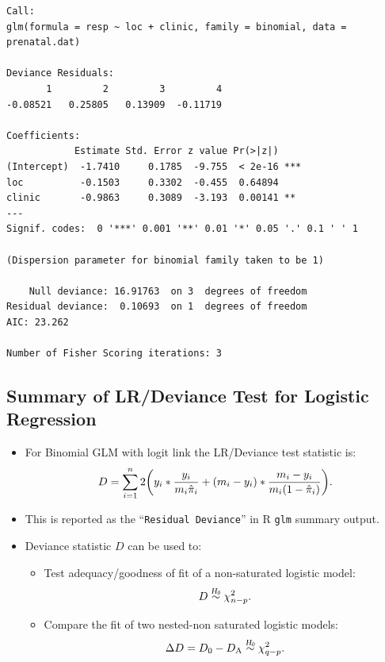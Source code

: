 \documentclass{article}\usepackage[]{graphicx}\usepackage[svgnames]{xcolor}
\makeatletter
\newenvironment{kframe}{%
 \def\at@end@of@kframe{}%
 \ifinner\ifhmode%
  \def\at@end@of@kframe{\end{minipage}}%
  \begin{minipage}{\columnwidth}%
 \fi\fi%
 \def\FrameCommand##1{\hskip\@totalleftmargin \hskip-\fboxsep
 \colorbox{shadecolor}{##1}\hskip-\fboxsep
     \hskip-\linewidth \hskip-\@totalleftmargin \hskip\columnwidth}%
 \MakeFramed {\advance\hsize-\width
   \@totalleftmargin\z@ \linewidth\hsize
   \@setminipage}}%
 {\par\unskip\endMakeFramed%
 \at@end@of@kframe}
\newenvironment{knitrout}{}{} %
\let\log\relax%
\newcommand{\HN}{\textsl{H}_{\textsl{0}}}%
\makeatother
\begin{document}
\begin{itemize}
\begin{knitrout}
\begin{kframe}
\begin{verbatim}
Call:
glm(formula = resp ~ loc + clinic, family = binomial, data = prenatal.dat)

Deviance Residuals: 
       1         2         3         4  
-0.08521   0.25805   0.13909  -0.11719  

Coefficients:
            Estimate Std. Error z value Pr(>|z|)    
(Intercept)  -1.7410     0.1785  -9.755  < 2e-16 ***
loc          -0.1503     0.3302  -0.455  0.64894    
clinic       -0.9863     0.3089  -3.193  0.00141 ** 
---
Signif. codes:  0 '***' 0.001 '**' 0.01 '*' 0.05 '.' 0.1 ' ' 1

(Dispersion parameter for binomial family taken to be 1)

    Null deviance: 16.91763  on 3  degrees of freedom
Residual deviance:  0.10693  on 1  degrees of freedom
AIC: 23.262

Number of Fisher Scoring iterations: 3
\end{verbatim}
\end{kframe}
\end{knitrout}
\end{itemize}
\subsection*{Summary of LR/Deviance Test for Logistic Regression}
\begin{itemize}
      \item For Binomial GLM with logit link the LR/Deviance test statistic is:
            \[ D=\sum_{i=1}^{n} 2\biggl(y_i\log*{\frac{y_i}{m_i\hat{\pi}_i}}+(m_i-y_i)\log*{\frac{m_i-y_i}{m_i(1-\hat{\pi}_i)}}\biggr). \]
      \item This is reported as the ``\texttt{Residual Deviance}'' in R \texttt{glm} summary output.
      \item Deviance statistic $ D $ can be used to:
            \begin{itemize}
                  \item Test adequacy/goodness of fit of a non-saturated logistic model:
                        \[ D \stackrel{\HN}{\sim}\chi^2_{n-p}. \]
                  \item Compare the fit of two nested-non saturated logistic models:
                        \[ \Delta D=D_0-D_\text{A} \stackrel{\HN}{\sim}\chi^2_{q-p}. \]
            \end{itemize}
\end{itemize}
\end{document}
